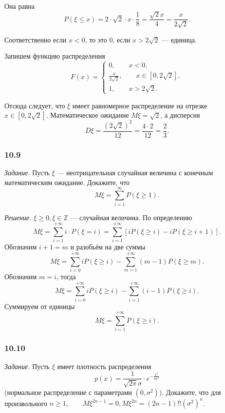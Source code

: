 \begin{enumerate}[label=\alph*)]
Она равна
$$P \left( \xi \leq x \right) =
2 \cdot \sqrt{2} \cdot x \cdot \frac{1}{8} =
\frac{ \sqrt{2} x}{4} =
\frac{x}{2 \sqrt{2}}.$$

Соответственно если $x < 0$, то это 0, если $x > 2 \sqrt{2} $ --- единица.

Запишем функцию распределения
$$F \left( x \right) =
\begin{cases}
0, \qquad x < 0, \\
\frac{x}{2 \sqrt{2}}, \qquad x \in \left[ 0, 2 \sqrt{2} \right], \\
1, \qquad x > 2 \sqrt{2}.
\end{cases}$$

Отсюда следует, что $ \xi $ имеет равномерное распределение на отрезке $x \in \left[0, 2 \sqrt{2} \right] $.
Математическое ожидание $M \xi = \sqrt{2}$, а дисперсия
$$D \xi = \frac{ \left( 2 \sqrt{2} \right)^2}{12} =
\frac{4 \cdot 2}{12} =
\frac{2}{3}.$$
\end{enumerate}

\subsubsection*{10.9}

\textit{Задание.} Пусть $ \xi $ --- неотрицательная случайная величина с конечным математическим ожидание.
Докажите, что
$$M \xi =
\sum \limits_{i=1}^{ \infty } P \left( \xi \geq 1 \right).$$

\textit{Решение.} $ \xi \geq 0, \xi \in \mathbb{Z}$ --- случайная величина.
По определению
$$M \xi =
\sum \limits_{i=1}^{+ \infty } i \cdot P \left( \xi = i \right) =
\sum \limits_{i=1}^{+ \infty } \left[ iP \left( \xi \geq i \right) - iP \left( \xi \geq i + 1 \right) \right].$$
Обозначим $i + 1 = m$ и разобьём на две суммы
$$M \xi =
\sum \limits_{i=0}^{+ \infty } iP \left( \xi \geq i \right) - \sum \limits_{m=1}^{+ \infty } \left( m-1 \right) P \left( \xi \geq m \right).$$
Обозначим $m=i$, тогда
$$M \xi =
\sum \limits_{i=0}^{+ \infty } iP \left( \xi \geq i \right) - \sum \limits_{i=1}^{+ \infty } \left( i-1 \right) P \left( \xi \geq i \right).$$
Суммируем от единицы
$$M \xi =
\sum \limits_{i=1}^{+ \infty } P \left( \xi \geq i \right).$$

\subsubsection*{10.10}

\textit{Задание.} Пусть $ \xi $ имеет плотность распределения
$$p \left( x \right) =
\frac{1}{ \sqrt{2 \pi } \sigma } \cdot e^{- \frac{x^2}{2 \sigma^2}}$$
(нормальное распределение с параметрами $ \left( 0, \sigma^2 \right) $).
Докажите, что для произвольного $n \geq 1, \qquad M \xi^{2n-1} = 0, M \xi^{2n} = \left( 2n-1 \right)!! \left( \sigma^2 \right)^n$.

